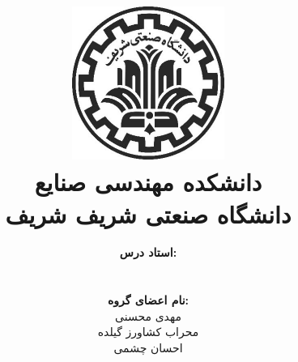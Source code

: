 \title{
	\center
	\includegraphics[width=5cm, height=5cm]{images/shariflogo.jpg} \\
	دانشکده مهندسی صنایع \\[25pt]     
	دانشگاه صنعتی شریف شریف \\
	\CourseName
}

\author{
	\textbf{استاد درس:}
	\\
	\Instructor \\[25pt]
	\\
	\textbf{نام اعضای گروه:}
	\\مهدی محسنی 
	\\محراب کشاورز گیلده 
	\\احسان چشمی
}
\date{\Semester}